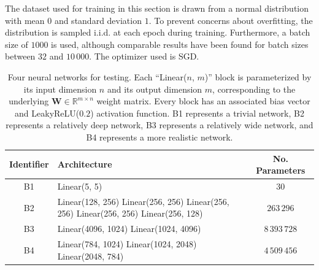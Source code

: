 \documentclass{article}
\theoremstyle{plain}
\theoremstyle{definition}
\theoremstyle{remark}
\newcommand{\vW}{\mathbf{W}}
\begin{document}
The dataset used for training in this section is drawn from a normal distribution with mean $0$ and standard deviation $1$. To prevent concerns about overfitting, the distribution is sampled i.i.d. at each epoch during training. Furthermore, a batch size of $1000$ is used, although comparable results have been found for batch sizes between $32$ and $10\,000$. The optimizer used is SGD.

\begin{table}[htbp]
    \begin{center}
        \caption{Four neural networks for testing. Each ``Linear($n$, $m$)'' block is parameterized by its input dimension $n$ and its output dimension $m$, corresponding to the underlying $\vW \in \mathbb{R}^{m \times n}$ weight matrix. Every block has an associated bias vector and LeakyReLU($0.2$) activation function. B1 represents a trivial network, B2 represents a relatively deep network, B3 represents a relatively wide network, and B4 represents a more realistic network.}
        \label{tab:networks}
        \vspace{0.1in}
        \begin{tabular}{|c|p{}|c|}
            \hline
            \textbf{Identifier} & \textbf{Architecture}                                                                                                    & \textbf{No. Parameters} \\
            \hline
            \hline
            B1                  & Linear(5, 5)                                                                                                             & $30$                    \\
            \hline
            B2                  & Linear(128, 256) \newline Linear(256, 256) \newline Linear(256, 256) \newline Linear(256, 256) \newline Linear(256, 128) & $263\,296$              \\
            \hline
            B3                  & Linear(4096, 1024) \newline Linear(1024, 4096)                                                                           & $8\,393\,728$           \\
            \hline
            B4                  & Linear(784, 1024) \newline Linear(1024, 2048) \newline Linear(2048, 784)                                                 & $4\,509\,456$           \\
            \hline
        \end{tabular}
    \end{center}
\end{table}
\end{document}
